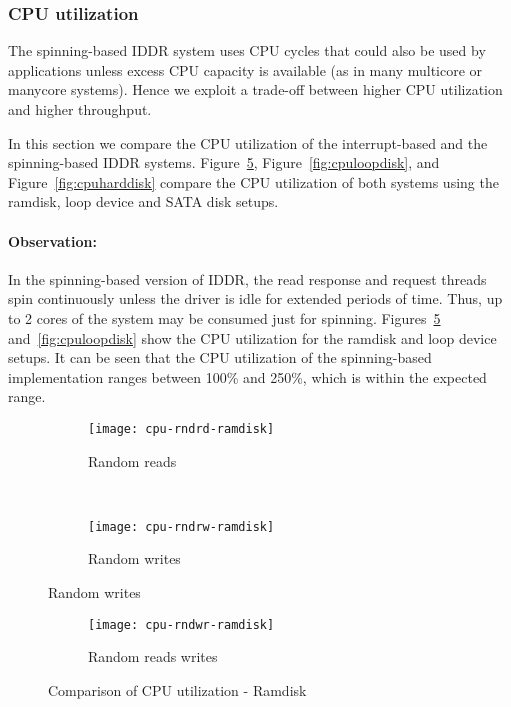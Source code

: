 \subsubsection*{CPU utilization}

The spinning-based IDDR system uses CPU cycles that could also be
used by applications unless excess CPU capacity is available (as in many
multicore or manycore systems). Hence we exploit a trade-off between higher 
CPU utilization and higher throughput.

In this section we compare the CPU utilization of the interrupt-based and
the spinning-based IDDR systems. Figure~\ref{fig:cpuramdisk}, Figure~\ref{fig:cpuloopdisk}, and
Figure~\ref{fig:cpuharddisk} compare the CPU utilization of both 
systems using the ramdisk, loop device and SATA disk setups.

\paragraph{Observation: }
In the spinning-based version of IDDR, the read response and request threads
spin continuously unless the driver is idle for extended periods of time.
Thus, up to 2 cores of the system may be consumed just for spinning.
Figures~\ref{fig:cpuramdisk} and~\ref{fig:cpuloopdisk} show the CPU
utilization for the ramdisk and loop device setups.
It can be seen that the CPU utilization of the spinning-based 
implementation ranges between 100\% and 250\%, which is within the
expected range.

\begin{figure}[!ht]
\centering
  \begin{subfigure}[b]{\textwidth}
  \texttt{[image: cpu-rndrd-ramdisk]}
  \caption{Random reads}
  \label{subfig:cpu-rndrd-ramdisk}
  \end{subfigure}\\
  \begin{subfigure}[b]{\textwidth}
  \texttt{[image: cpu-rndrw-ramdisk]}
  \caption{Random writes}
  \label{subfig:cpu-rndrw-ramdisk}
  \end{subfigure}
\end{figure}

\begin{figure}[H]
  \ContinuedFloat
  \begin{subfigure}[b]{\textwidth}
  \texttt{[image: cpu-rndwr-ramdisk]}
  \caption{Random reads writes}
  \label{subfig:cpu-rndwr-ramdisk}
  \end{subfigure}
\caption{Comparison of CPU utilization - Ramdisk}\label{fig:cpuramdisk}
\end{figure}

